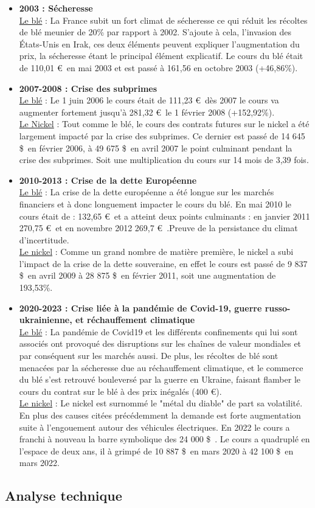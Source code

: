 \begin{itemize}
    \item \textbf{2003 : Sécheresse}\\
    \underline{Le blé} : La France subit un fort climat de sécheresse ce qui réduit les récoltes de blé meunier de 20\% par rapport à 2002. S'ajoute à cela, l'invasion des 
    États-Unis en Irak, ces deux éléments peuvent expliquer l'augmentation du prix, la sécheresse étant le principal élément explicatif. Le cours du blé était de 110,01 
    \euro\ en mai 
    2003 et est passé à 161,56  en octobre 2003 (+46,86\%).
    \item \textbf{2007-2008 : Crise des subprimes}\\
     \underline{Le blé} : Le 1 juin 2006 le cours était de 111,23 \euro\, dès 2007 le cours va augmenter fortement jusqu'à 281,32 \euro\ le 1 février 2008 (+152,92\%). \\
     [5pt]
     \underline{Le Nickel} :  Tout comme le blé, le cours des contrats futures sur le nickel a été largement impacté par la crise des subprimes. Ce dernier est passé de 14 
     645 \$\ en février 2006, à 49 675 \$\ en avril 2007 le point culminant pendant la crise des subprimes. Soit une multiplication du cours sur 14 mois de 3,39 fois.
    \item \textbf{2010-2013 : Crise de la dette Européenne}\\
    \underline{Le blé} : La crise de la dette européenne a été longue sur les marchés financiers et à donc longuement impacter le cours du blé.
    En mai 2010 le cours était de : 132,65 \euro\ et a atteint deux points culminants : en janvier 2011 270,75 \euro\ et en novembre 2012 269,7 \euro\ .Preuve 
    de la persistance du climat d'incertitude.\\[5pt]
    \underline{Le nickel} : Comme un grand nombre de matière première, le nickel a subi l'impact de la crise de la dette souveraine, en effet le cours est passé de 9 837 
    \$\ en avril 2009 à 28 875 \$\ en février 2011, soit une augmentation de 193,53\%.
    \item \textbf{2020-2023 : Crise liée à la pandémie de Covid-19, guerre russo-ukrainienne, et réchauffement climatique}\\
    \underline{Le blé} : La pandémie de Covid19 et les différents confinements qui lui sont associés ont provoqué des disruptions sur les chaînes de valeur mondiales et 
    par 
    conséquent sur les marchés aussi. De plus, les récoltes de blé sont menacées par la sécheresse due au réchauffement climatique, et le commerce du blé s'est 
    retrouvé bouleversé par la guerre en Ukraine, faisant flamber le cours du contrat sur le blé à des prix inégalés (400 \euro).\\[5pt]
    \underline{Le nickel} : Le nickel est surnommé le "métal du diable" de part sa volatilité. En plus des causes citées précédemment la demande est forte augmentation 
    suite à l'engouement autour des véhicules électriques. En 2022 le cours a franchi à nouveau la barre symbolique des 24 000 \$\ . Le cours a quadruplé en l'espace de 
    deux ans, il à grimpé de 10 887 \$\ en mars 2020 à 42 100 \$\ en mars 2022.
\end{itemize}
\subsection{Analyse technique}